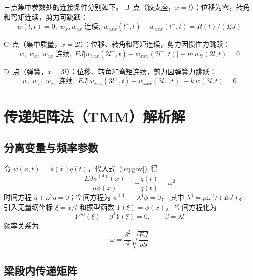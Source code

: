 \documentclass[twoside,12pt]{ctexart}
\begin{document}
三点集中参数处的连接条件分别如下。
B~点（铰支座，$x=l$）：位移为零，转角和弯矩连续，剪力可跳跃：
\begin{equation}\label{eq:hinge}
  w(l,t)=0,\; w_x,w_{xx}\;\text{连续},\; w_{xxx}(l^+,t)-w_{xxx}(l^-,t)=R(t)/(EJ)
\end{equation}

C~点（集中质量，$x=2l$）：位移、转角和弯矩连续，剪力因惯性力跳跃：
\begin{equation}\label{eq:mass}
  w,\;w_x,\;w_{xx}\;\text{连续},\;
  EJ\big[w_{xxx}(2l^+,t)-w_{xxx}(2l^-,t)\big]+m\,w_{tt}(2l,t)=0
\end{equation}

D~点（弹簧，$x=3l$）：位移、转角和弯矩连续，剪力因弹簧力跳跃：
\begin{equation}\label{eq:spring}
  w,\;w_x,\;w_{xx}\;\text{连续},\;
  EJ\big[w_{xxx}(3l^+,t)-w_{xxx}(3l^-,t)\big]+k\,w(3l,t)=0
\end{equation}

\section{传递矩阵法（TMM）解析解}

\subsection{分离变量与频率参数}

令 $w(x,t)=\phi(x)q(t)$，代入式~(\ref{eq:gov})~得
\begin{equation}
  \frac{EJ\phi^{(4)}(x)}{\mu\phi(x)}=-\frac{\ddot q(t)}{q(t)}=\omega^2
\end{equation}
时间方程 $\ddot q+\omega^2 q=0$；空间方程为 $\phi^{(4)}-\lambda^4\phi=0$，
其中 $\lambda^4=\mu\omega^2/(EJ)$。
引入无量纲坐标 $\xi=x/l$ 和振型函数 $Y(\xi)=\phi(x)$，
空间方程化为
\begin{equation}\label{eq:Yeq}
  Y''''(\xi)-\beta^4 Y(\xi)=0,\qquad \beta=\lambda l
\end{equation}
频率关系为
\begin{equation}\label{eq:omega}
  \boxed{\;\omega=\frac{\beta^2}{l^2}\sqrt{\frac{EJ}{\rho S}}\;}
\end{equation}

\subsection{梁段内传递矩阵}
\end{document}
